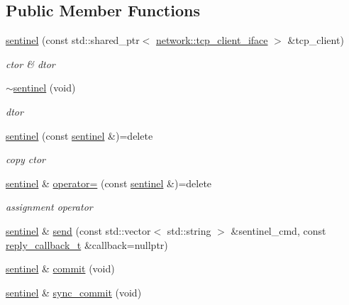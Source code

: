 \subsection*{Public Member Functions}
\begin{DoxyCompactItemize}
\item 
\hyperlink{classcpp__redis_1_1sentinel_af53665f5834dfe5861a6310318ae5169}{sentinel} (const std\+::shared\+\_\+ptr$<$ \hyperlink{classcpp__redis_1_1network_1_1tcp__client__iface}{network\+::tcp\+\_\+client\+\_\+iface} $>$ \&tcp\+\_\+client)
\begin{DoxyCompactList}\small\item\em ctor \& dtor \end{DoxyCompactList}\item 
\hyperlink{classcpp__redis_1_1sentinel_af8535e89714db8ddcd7e74337ee5385a}{$\sim$sentinel} (void)
\begin{DoxyCompactList}\small\item\em dtor \end{DoxyCompactList}\item 
\hyperlink{classcpp__redis_1_1sentinel_a4c3b68f6e930b2e9723816bb8bed5a8f}{sentinel} (const \hyperlink{classcpp__redis_1_1sentinel}{sentinel} \&)=delete
\begin{DoxyCompactList}\small\item\em copy ctor \end{DoxyCompactList}\item 
\hyperlink{classcpp__redis_1_1sentinel}{sentinel} \& \hyperlink{classcpp__redis_1_1sentinel_a06b8d049160e3990cdac3158aaf160a6}{operator=} (const \hyperlink{classcpp__redis_1_1sentinel}{sentinel} \&)=delete
\begin{DoxyCompactList}\small\item\em assignment operator \end{DoxyCompactList}\item 
\hyperlink{classcpp__redis_1_1sentinel}{sentinel} \& \hyperlink{classcpp__redis_1_1sentinel_a0df522dbd7debda4e73f616a62d6f5ee}{send} (const std\+::vector$<$ std\+::string $>$ \&sentinel\+\_\+cmd, const \hyperlink{classcpp__redis_1_1sentinel_ae1a150ff8787208c47414397a061c9a7}{reply\+\_\+callback\+\_\+t} \&callback=nullptr)
\item 
\hyperlink{classcpp__redis_1_1sentinel}{sentinel} \& \hyperlink{classcpp__redis_1_1sentinel_ad4f85d486499f82225b244f85091b31e}{commit} (void)
\item 
\hyperlink{classcpp__redis_1_1sentinel}{sentinel} \& \hyperlink{classcpp__redis_1_1sentinel_a8e4d231ac89510c337fe97fe9e642785}{sync\+\_\+commit} (void)

\end{DoxyCompactItemize}
